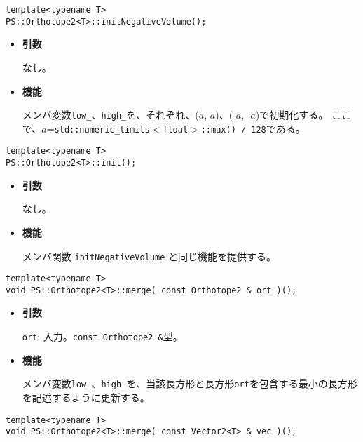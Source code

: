 \begin{screen}
\begin{verbatim}
template<typename T>
PS::Orthotope2<T>::initNegativeVolume();
\end{verbatim}
\end{screen}

\begin{itemize}

\item{{\bf 引数}}

なし。

\item{{\bf 機能}}

メンバ変数\texttt{low\_}、\texttt{high\_}を、それぞれ、($a$, $a$)、(-$a$, -$a$)で初期化する。
ここで、$a$=\texttt{std::numeric\_limits$<$float$>$::max() / 128}である。

\end{itemize}

\begin{screen}
\begin{verbatim}
template<typename T>
PS::Orthotope2<T>::init();
\end{verbatim}
\end{screen}

\begin{itemize}

\item{{\bf 引数}}

なし。

\item{{\bf 機能}}

メンバ関数 \texttt{initNegativeVolume} と同じ機能を提供する。

\end{itemize}

\begin{screen}
\begin{verbatim}
template<typename T>
void PS::Orthotope2<T>::merge( const Orthotope2 & ort )();
\end{verbatim}
\end{screen}

\begin{itemize}

\item{{\bf 引数}}

\texttt{ort}: 入力。\texttt{const Orthotope2 \&}型。

\item{{\bf 機能}}

メンバ変数\texttt{low\_}、\texttt{high\_}を、当該長方形と長方形\texttt{ort}を包含する最小の長方形を記述するように更新する。

\end{itemize}
\begin{screen}
\begin{verbatim}
template<typename T>
void PS::Orthotope2<T>::merge( const Vector2<T> & vec )();
\end{verbatim}
\end{screen}

